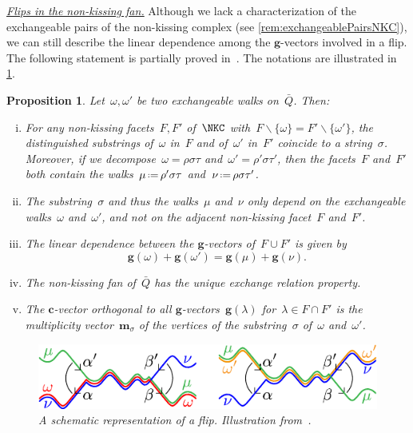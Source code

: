 \documentclass{amsart}
\newtheorem{proposition}[theorem]{Proposition}
\theoremstyle{definition}
\renewcommand{\b}[1]{{\boldsymbol{#1}}} %
\newcommand{\ssm}{\smallsetminus} %
\newcommand{\eqdef}{\mbox{\,\raisebox{0.2ex}{\scriptsize\ensuremath{\mathrm:}}\ensuremath{=}\,}} %
\newcommand{\para}[1]{\medskip\noindent\uline{\textit{#1.}}} %
\newcommand{\multiplicityVector}{\b{m}} %
\newcommand{\gvector}[1]{\b{g}(#1)} %
\newcommand{\quiver}{\bar Q} %
\begin{document}
\para{Flips in the non-kissing fan}
%
Although we lack a characterization of the exchangeable pairs of the non-kissing complex (see \cref{rem:exchangeablePairsNKC}), we can still describe the linear dependence among the $\b{g}$-vectors involved in a flip.
The following statement is partially proved in~\cite[Thm.~4.17]{PaluPilaudPlamondon-nonkissing}.
The notations are illustrated in \cref{fig:flip}.

\begin{proposition}
\label{prop:exchangeablePairsNKC}
Let~$\omega, \omega'$ be two exchangeable walks on~$\quiver$. Then:
\begin{enumerate}[(i)]

\item For any non-kissing facets~$F, F'$ of~$\NKC$ with~$F \ssm \{\omega\} = F' \ssm \{\omega'\}$, the distinguished substrings of~$\omega$ in~$F$ and of~$\omega'$ in~$F'$ coincide to a string~$\sigma$. Moreover, if we decompose~${\omega = \rho \sigma \tau}$ and~${\omega' = \rho' \sigma \tau'}$, then the facets~$F$ and~$F'$ both contain the walks~$\mu \eqdef \rho' \sigma \tau$ and~$\nu \eqdef \rho \sigma \tau'$.
\item The substring~$\sigma$ and thus the walks~$\mu$ and~$\nu$ only depend on the exchangeable walks~$\omega$ and~$\omega'$, and not on the adjacent non-kissing facet~$F $ and~$F'$.
\item The linear dependence between the $\b{g}$-vectors of~$F \cup F'$ is given by
\[
\gvector{\omega} + \gvector{\omega'} = \gvector{\mu} + \gvector{\nu}.
\]
\item The non-kissing fan of~$\quiver$ has the unique exchange relation property.
\item The $\b{c}$-vector orthogonal to all $\b{g}$-vectors~$\gvector{\lambda}$ for~$\lambda \in F \cap F'$ is the multiplicity vector~$\multiplicityVector_{\sigma}$ of the vertices of the substring~$\sigma$ of~$\omega$ and~$\omega'$.
\end{enumerate}

\begin{figure}[b]
	\capstart
	\centerline{\includegraphics[scale=1]{flip}}
	\caption{A schematic representation of a flip. Illustration from~\cite{PaluPilaudPlamondon-nonkissing}.}
	\label{fig:flip}
\end{figure}
\end{proposition}
\end{document}
